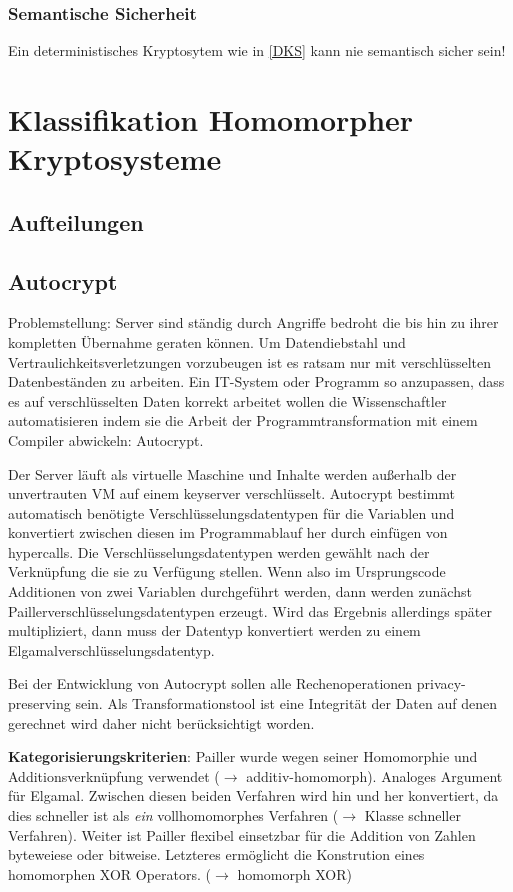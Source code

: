 \documentclass[12pt,a4paper]{scrartcl}	%
\begin{document}
\subsubsection{Semantische Sicherheit}
Ein deterministisches Kryptosytem wie in \ref{DKS} kann nie semantisch sicher sein!

\section{Klassifikation Homomorpher Kryptosysteme}
\subsection{Aufteilungen}
\subsection{Autocrypt} \cite{tople2013autocrypt}
Problemstellung: Server sind ständig durch Angriffe bedroht die bis hin zu ihrer kompletten Übernahme geraten können. Um Datendiebstahl und Vertraulichkeitsverletzungen vorzubeugen ist es ratsam nur mit verschlüsselten Datenbeständen zu arbeiten. Ein IT-System oder Programm so anzupassen, dass es auf verschlüsselten Daten korrekt arbeitet wollen die Wissenschaftler automatisieren indem sie die Arbeit der Programmtransformation mit einem Compiler abwickeln: Autocrypt.

Der Server läuft als virtuelle Maschine und Inhalte werden außerhalb der unvertrauten VM auf einem keyserver verschlüsselt. Autocrypt bestimmt automatisch benötigte Verschlüsselungsdatentypen für die Variablen und konvertiert zwischen diesen im Programmablauf her durch einfügen von hypercalls. Die Verschlüsselungsdatentypen werden gewählt nach der Verknüpfung die sie zu Verfügung stellen. Wenn also im Ursprungscode Additionen von zwei Variablen durchgeführt werden, dann werden zunächst Paillerverschlüsselungsdatentypen erzeugt. Wird das Ergebnis allerdings später multipliziert, dann muss der Datentyp konvertiert werden zu einem Elgamalverschlüsselungsdatentyp.

Bei der Entwicklung von Autocrypt sollen alle Rechenoperationen privacy-preserving sein. Als Transformationstool ist eine Integrität der Daten auf denen gerechnet wird daher nicht berücksichtigt worden.

\textbf{Kategorisierungskriterien}: Pailler wurde wegen seiner Homomorphie und Additionsverknüpfung verwendet ($\rightarrow$ additiv-homomorph). Analoges Argument für Elgamal. Zwischen diesen beiden Verfahren wird hin und her konvertiert, da dies schneller ist als \textit{ein} vollhomomorphes Verfahren ($\rightarrow$ Klasse schneller Verfahren). Weiter ist Pailler flexibel einsetzbar für die Addition von Zahlen byteweiese oder bitweise. Letzteres ermöglicht die Konstrution eines homomorphen XOR Operators. ($\rightarrow$ homomorph XOR)
\end{document}
